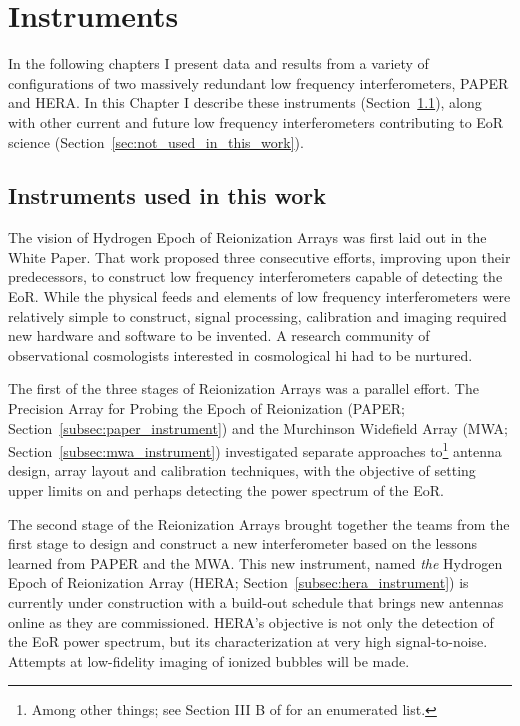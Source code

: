 \chapter{Instruments}
\label{chapter:instruments}

In the following chapters I present data and results from a variety of configurations of two massively redundant low frequency interferometers, PAPER and HERA. In this Chapter I describe these instruments (Section~\ref{sec:used_in_this_work}), along with other current and future low frequency interferometers contributing to EoR science (Section~\ref{sec:not_used_in_this_work}).

\section{Instruments used in this work}
\label{sec:used_in_this_work}

The vision of Hydrogen Epoch of Reionization Arrays was first laid out in the \cite{HERAWhitePaper} White Paper. That work proposed three consecutive efforts, improving upon their predecessors, to construct low frequency interferometers capable of detecting the EoR. While the physical feeds and elements of low frequency interferometers were relatively simple to construct, signal processing, calibration and imaging required new hardware and software to be invented. A research community of observational cosmologists interested in cosmological {\sc hi} had to be nurtured.

The first of the three stages of Reionization Arrays was a parallel effort. The Precision Array for Probing the Epoch of Reionization (PAPER; Section~\ref{subsec:paper_instrument}) and the Murchinson Widefield Array (MWA; Section~\ref{subsec:mwa_instrument}) investigated separate approaches to\footnote{Among other things; see Section III B of \citet{HERAWhitePaper} for an enumerated list.} antenna design, array layout and calibration techniques, with the objective of setting upper limits on and perhaps detecting the power spectrum of the EoR.

The second stage of the Reionization Arrays brought together the teams from the first stage to design and construct a new interferometer based on the lessons learned from PAPER and the MWA. This new instrument, named \textit{the} Hydrogen Epoch of Reionization Array (HERA; Section~\ref{subsec:hera_instrument}) is currently under construction with a build-out schedule that brings new antennas online as they are commissioned. HERA's objective is not only the detection of the EoR power spectrum, but its characterization at very high signal-to-noise. Attempts at low-fidelity imaging of ionized bubbles will be made.

